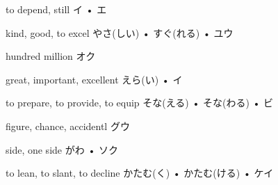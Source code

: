 



\setcounter{cardnum}{25}

		{to depend, still}
		{イ • エ}
		{}{}
		{}{}
		{}{}
		{}{}
		{}{}

		{kind, good, to excel}
		{やさ(しい) • すぐ(れる) • ユウ}
		{}{}
		{}{}
		{}{}
		{}{}
		{}{}

		{hundred million}
		{オク}
		{}{}
		{}{}
		{}{}
		{}{}
		{}{}

		{great, important, excellent}
		{えら(い) • イ}
		{}{}
		{}{}
		{}{}
		{}{}
		{}{}

		{to prepare, to provide, to equip}
		{そな(える) • そな(わる) • ビ}
		{}{}
		{}{}
		{}{}
		{}{}
		{}{}

		{figure, chance, accidentl}
		{グウ}
		{}{}
		{}{}
		{}{}
		{}{}
		{}{}

		{side, one side}
		{がわ • ソク}
		{}{}
		{}{}
		{}{}
		{}{}
		{}{}

		{to lean, to slant, to decline}
		{かたむ(く) • かたむ(ける) • ケイ}
		{}{}
		{}{}
		{}{}
		{}{}
		{}{}


